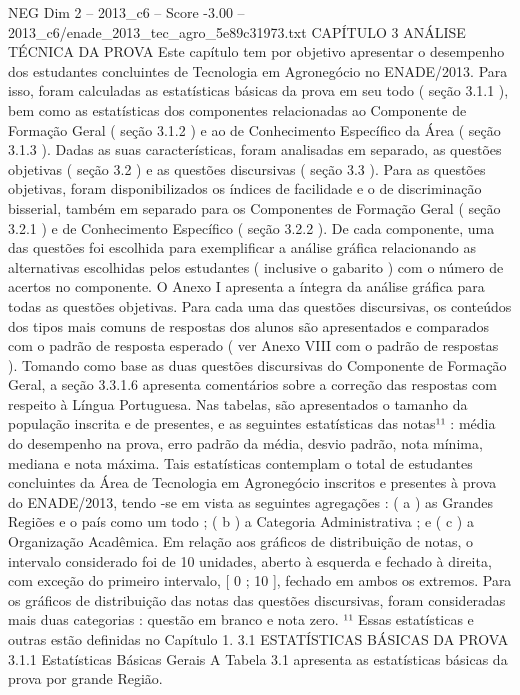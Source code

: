 \begin{textsample}{NEG Dim 2 – 2013\_c6 – Score -3.00 – 2013\_c6/enade\_2013\_tec\_agro\_5e89c31973.txt}  \label{ex:f2_neg_052}
CAPÍTULO 3 ANÁLISE TÉCNICA DA PROVA Este capítulo tem por objetivo apresentar o desempenho dos estudantes concluintes de Tecnologia em Agronegócio no ENADE/2013.
Para isso, foram calculadas as estatísticas básicas da prova em seu todo ( seção 3.1.1 ), bem como as estatísticas dos componentes relacionadas ao Componente de Formação Geral ( seção 3.1.2 ) e ao de Conhecimento Específico da Área ( seção 3.1.3 ).
Dadas as suas características, foram analisadas em separado, as questões objetivas ( seção 3.2 ) e as questões discursivas ( seção 3.3 ).
Para as questões objetivas, foram disponibilizados os índices de facilidade e o de discriminação bisserial, também em separado para os Componentes de Formação Geral ( seção 3.2.1 ) e de Conhecimento Específico ( seção 3.2.2 ).
De cada componente, uma das questões foi escolhida para exemplificar a análise gráfica relacionando as alternativas escolhidas pelos estudantes ( inclusive o gabarito ) com o número de acertos no componente.
O Anexo I apresenta a íntegra da análise gráfica para todas as questões objetivas.
Para cada uma das questões discursivas, os conteúdos dos tipos mais comuns de respostas dos alunos são apresentados e comparados com o padrão de resposta esperado ( ver Anexo VIII com o padrão de respostas ).
Tomando como base as duas questões discursivas do Componente de Formação Geral, a seção 3.3.1.6 apresenta comentários sobre a correção das respostas com respeito à Língua Portuguesa.
Nas tabelas, são apresentados o tamanho da população inscrita e de presentes, e as seguintes estatísticas das notas¹¹ : média do desempenho na prova, erro padrão da média, desvio padrão, nota mínima, mediana e nota máxima.
Tais estatísticas contemplam o total de estudantes concluintes da Área de Tecnologia em Agronegócio inscritos e presentes à prova do ENADE/2013, tendo -se em vista as seguintes agregações : ( a ) as Grandes Regiões e o país como um todo ; ( b ) a Categoria Administrativa ; e ( c ) a Organização Acadêmica.
Em relação aos gráficos de distribuição de notas, o intervalo considerado foi de 10 unidades, aberto à esquerda e fechado à direita, com exceção do primeiro intervalo, [ 0 ; 10 ], fechado em ambos os extremos.
Para os gráficos de distribuição das notas das questões discursivas, foram consideradas mais duas categorias : questão em branco e nota zero. ¹¹ Essas estatísticas e outras estão definidas no Capítulo 1. 3.1 ESTATÍSTICAS BÁSICAS DA PROVA 3.1.1 Estatísticas Básicas Gerais A Tabela 3.1 apresenta as estatísticas básicas da prova por grande Região.

\end{textsample}
